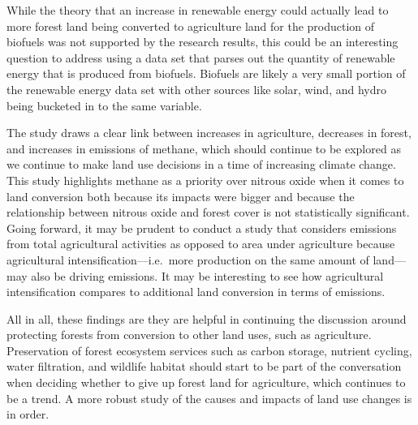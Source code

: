 \documentclass[12pt,]{article}
\begin{document}
While the theory that an increase in renewable energy could actually
lead to more forest land being converted to agriculture land for the
production of biofuels was not supported by the research results, this
could be an interesting question to address using a data set that parses
out the quantity of renewable energy that is produced from biofuels.
Biofuels are likely a very small portion of the renewable energy data
set with other sources like solar, wind, and hydro being bucketed in to
the same variable.

The study draws a clear link between increases in agriculture, decreases
in forest, and increases in emissions of methane, which should continue
to be explored as we continue to make land use decisions in a time of
increasing climate change. This study highlights methane as a priority
over nitrous oxide when it comes to land conversion both because its
impacts were bigger and because the relationship between nitrous oxide
and forest cover is not statistically significant. Going forward, it may
be prudent to conduct a study that considers emissions from total
agricultural activities as opposed to area under agriculture because
agricultural intensification---i.e.~more production on the same amount
of land---may also be driving emissions. It may be interesting to see
how agricultural intensification compares to additional land conversion
in terms of emissions.

All in all, these findings are they are helpful in continuing the
discussion around protecting forests from conversion to other land uses,
such as agriculture. Preservation of forest ecosystem services such as
carbon storage, nutrient cycling, water filtration, and wildlife habitat
should start to be part of the conversation when deciding whether to
give up forest land for agriculture, which continues to be a trend. A
more robust study of the causes and impacts of land use changes is in
order.
\end{document}
